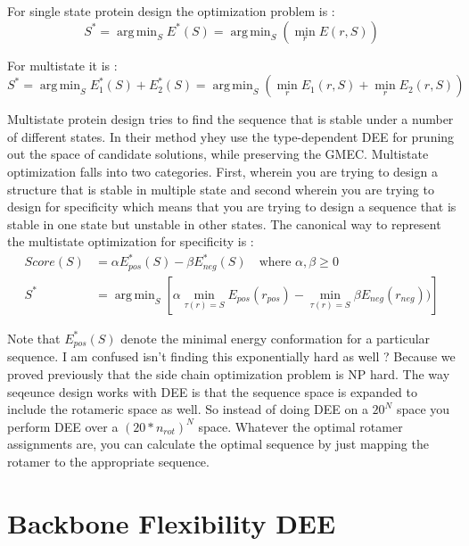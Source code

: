 \documentclass[a4]{article}
\DeclareMathOperator*{\argmin}{arg\,min}
\begin{document}
For single state protein design the optimization problem is  : 
\[
S^* = \argmin_S E^*(S) = \argmin_S \left( \min_r E(r,S) \right)
\]

For multistate it is :
\[
S^* = \argmin_S E^*_1(S) + E^*_2(S) = \argmin_S\left( \min_r E_1(r,S) + \min_r E_2(r,S)\right)
\]

Multistate protein design tries to find the sequence that is stable under a number of different states. In their method yhey use the type-dependent DEE for pruning out the space of candidate solutions, while preserving the GMEC. Multistate optimization falls into two categories. First, wherein you are trying to design a structure that is stable in multiple state and second wherein you are trying to design for specificity which means that you are trying to design a sequence that is stable in one state but unstable in other states. The canonical way to represent the multistate optimization for specificity is :
\[
\begin{split}
Score(S) &= \alpha E_{pos}^*(S) - \beta E_{neg}^*(S) \quad \text{where } \alpha,\beta \geq 0 \\
S^* & = \argmin_S \left[\alpha \min_{\tau(r)=S} E_{pos}(r_{pos}) - \min_{\tau(r)=S} \beta E_{neg}(r_{neg})) \right]
\end{split} 
\]

Note that $E_{pos}^*(S)$ denote the minimal energy conformation for a particular sequence. I am confused isn't finding this exponentially hard as well ? Because we proved previously that the side chain optimization problem is NP hard. The way seqeunce design works with DEE is that the sequence space is expanded to include the rotameric space as well. So instead of doing DEE on a $20^N$ space you perform DEE over a $(20*n_{rot})^N$ space. Whatever the optimal rotamer assignments are, you can calculate the optimal sequence by just mapping the rotamer to the appropriate sequence. 






\section{Backbone Flexibility DEE}
\end{document}
